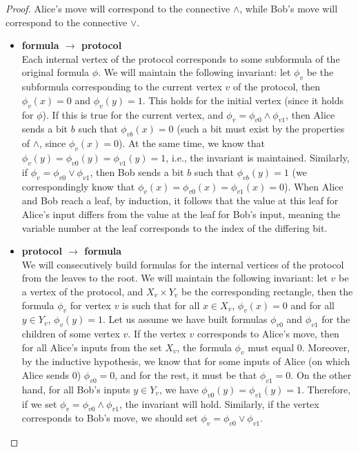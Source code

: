 \documentclass[12pt,sans]{article}
\theoremstyle{definition}
\theoremstyle{plain}
\theoremstyle{remark}
\begin{document}
\begin{proof}
    Alice's move will correspond to the connective $\land$, while Bob's move will correspond to the connective $\lor$.

    \begin{itemize}
        \item \textbf{formula $\to$ protocol}\\
        Each internal vertex of the protocol corresponds to some subformula of the original formula $\phi$. We will maintain the following invariant: let $\phi_v$ be the subformula corresponding to the current vertex $v$ of the protocol, then $\phi_v(x) = 0$ and $\phi_v(y) = 1$. This holds for the initial vertex (since it holds for $\phi$). If this is true for the current vertex, and $\phi_v = \phi_{v0} \land \phi_{v1}$, then Alice sends a bit $b$ such that $\phi_{vb}(x) = 0$ (such a bit must exist by the properties of $\land$, since $\phi_v(x) = 0$). At the same time, we know that $\phi_v(y) = \phi_{v0}(y) = \phi_{v1}(y) = 1$, i.e., the invariant is maintained. Similarly, if $\phi_v = \phi_{v0} \lor \phi_{v1}$, then Bob sends a bit $b$ such that $\phi_{vb}(y) = 1$ (we correspondingly know that $\phi_v(x) = \phi_{v0}(x) = \phi_{v1}(x) = 0$). When Alice and Bob reach a leaf, by induction, it follows that the value at this leaf for Alice's input differs from the value at the leaf for Bob's input, meaning the variable number at the leaf corresponds to the index of the differing bit.

        \item \textbf{protocol $\to$ formula}\\
        We will consecutively build formulas for the internal vertices of the protocol from the leaves to the root. We will maintain the following invariant: let $v$ be a vertex of the protocol, and $X_v \times Y_v$ be the corresponding rectangle, then the formula $\phi_v$ for vertex $v$ is such that for all $x \in X_v$, $\phi_v(x) = 0$ and for all $y \in Y_v$, $\phi_v(y) = 1$. Let us assume we have built formulas $\phi_{v0}$ and $\phi_{v1}$ for the children of some vertex $v$. If the vertex $v$ corresponds to Alice's move, then for all Alice's inputs from the set $X_v$, the formula $\phi_v$ must equal 0. Moreover, by the inductive hypothesis, we know that for some inputs of Alice (on which Alice sends 0) $\phi_{v0} = 0$, and for the rest, it must be that $\phi_{v1} = 0$. On the other hand, for all Bob's inputs $y \in Y_v$, we have $\phi_{v0}(y) = \phi_{v1}(y) = 1$. Therefore, if we set $\phi_v = \phi_{v0} \land \phi_{v1}$, the invariant will hold. Similarly, if the vertex corresponds to Bob's move, we should set $\phi_v = \phi_{v0} \lor \phi_{v1}$.


\end{itemize}
\end{proof}
\end{document}
